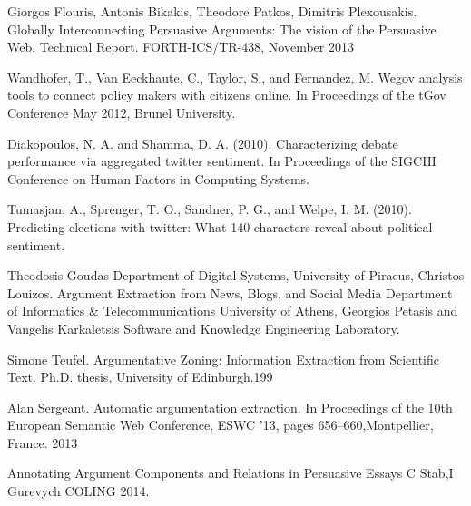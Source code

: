 \begin{thebibliography}{69}

 Giorgos Flouris, Antonis Bikakis, Theodore Patkos, Dimitris Plexousakis. Globally Interconnecting Persuasive Arguments: The vision of the Persuasive Web. Technical Report. FORTH-ICS/TR-438, November 2013

 Wandhofer, T., Van Eeckhaute, C., Taylor, S., and Fernandez, M.  Wegov analysis tools to connect policy makers with citizens online. In Proceedings of the tGov Conference May 2012, Brunel University.

 Diakopoulos, N. A. and Shamma, D. A. (2010). Characterizing debate performance via aggregated twitter sentiment. In Proceedings of the SIGCHI Conference on Human Factors in Computing Systems.

 Tumasjan, A., Sprenger, T. O., Sandner, P. G., and Welpe, I. M. (2010). Predicting elections with twitter: What 140 characters reveal about political sentiment.

 Theodosis Goudas Department of Digital Systems, University of Piraeus, Christos Louizos. Argument Extraction from News, Blogs, and Social Media  Department of Informatics \& Telecommunications University of Athens, Georgios Petasis  and Vangelis Karkaletsis Software and Knowledge Engineering Laboratory.

 Simone Teufel.  Argumentative Zoning: Information Extraction from Scientific Text. Ph.D. thesis, University of Edinburgh.199

 Alan Sergeant.  Automatic argumentation extraction. In Proceedings of the 10th European Semantic Web Conference, ESWC ’13, pages 656–660,Montpellier, France. 2013

 Annotating Argument Components and Relations in Persuasive Essays C Stab,I Gurevych COLING 2014.


\end{thebibliography}
